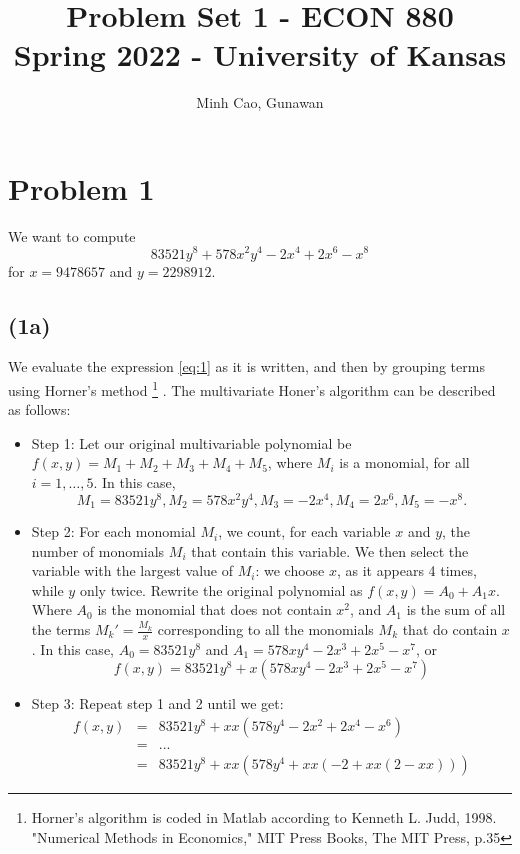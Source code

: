 \documentclass[11pt]{article}
\title{Problem Set 1 - ECON 880\\
	\small Spring 2022 - University of Kansas}
\author{Minh Cao, Gunawan}
\newcommand{\1}{\mathbbm{1}}
\newcounter{daggerfootnote}
\newcommand*{\daggerfootnote}[1]{%
	\setcounter{daggerfootnote}{\value{footnote}}%
	\renewcommand*{\thefootnote}{\fnsymbol{footnote}}%
	\footnote[2]{#1}%
	\setcounter{footnote}{\value{daggerfootnote}}%
	\renewcommand*{\thefootnote}{\arabic{footnote}}%
}
\begin{document}
\maketitle	
\section*{Problem 1}
We want to compute
\begin{equation}\label{eq:1}
	83521y^8 +578x^2 y^4 -2x^4 +2x^6 -x^8
\end{equation}
for $x = 9478657$ and $y = 2298912$.
\subsection*{(1a)}
We evaluate the expression \eqref{eq:1} as it is written, and then by grouping terms using Horner's method\daggerfootnote{Horner's algorithm is coded in Matlab according to Kenneth L. Judd, 1998. "Numerical Methods in Economics," MIT Press Books, The MIT Press, p.35}. The multivariate Honer's algorithm can be described as follows:\\
\begin{itemize}
\item Step 1: Let our original multivariable polynomial be $f(x,y) = M_{1} +M_{2}+M_{3}+M_{4}+M_{5}$, where $M_{i}$ is a monomial, for all $i=1,\ldots,5$. In this case, 
\[M_{1} = 83521y^{8}, M_{2} = 578x^{2}y^{4}, M_{3}= -2x^{4}, M_{4}=2x^{6}, M_{5} = -x^{8}.\]
\item Step 2: For each monomial $M_{i}$, we count, for each variable $x$ and $y$, the number of monomials $M_{i}$ that contain this variable. We then select the variable with the largest value of $M_{i}$: we choose $x$, as it appears 4 times, while $y$ only twice. Rewrite the original polynomial as $f(x,y) = A_{0}+A_{1}x$. Where $A_{0}$ is the monomial that does not contain $x^2$, and $A_{1}$ is the sum of all the terms ${M_{k}}' = \frac{M_{k}}{x} $ corresponding to all the monomials $M_{k}$ that do contain $x$. In this case, $A_{0} = 83521y^8$ and $A_{1} = 578xy^{4} - 2x^3+2x^{5}-x^{7}$, or
\[f(x,y) = 83521y^8 +x(578xy^{4} - 2x^{3}+2x^{5}-x^{7}) \]

\item Step 3: Repeat step 1 and 2 until we get:
\begin{eqnarray*}
	f(x,y) &=& 83521y^8 +xx(578y^{4} - 2x^{2}+2x^{4}-x^{6}) \\
		   &=& ...\\
		   &=& 83521y^8 +xx (578y^{4} +xx(-2+xx(2-xx)))
\end{eqnarray*}

\end{itemize}
\end{document}
